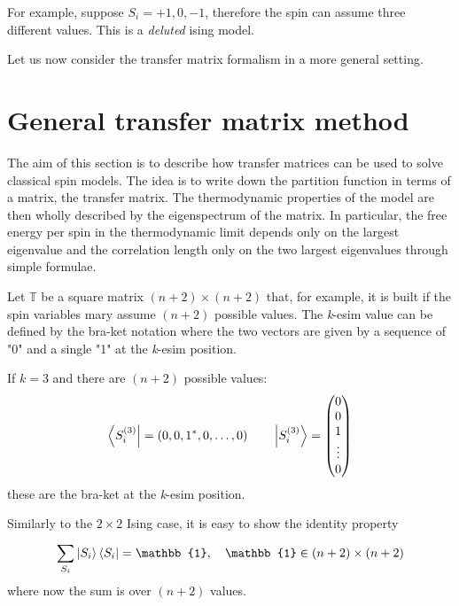 \documentclass[../main/main.tex]{subfiles}
\begin{document}
\begin{example}
  For example, suppose \( S_i = +1,0,-1 \), therefore the spin can assume three different values.   This is a \emph{deluted} ising model.
\end{example}
Let us now consider the transfer matrix formalism in a more general setting.

\section{General transfer matrix method}
The aim of this section is to describe how transfer matrices can be used to solve classical spin models. The idea is to write down the partition function in terms of a matrix, the transfer matrix. The thermodynamic properties of the model are then wholly described by the eigenspectrum of the matrix. In particular, the free energy per spin in the thermodynamic limit depends only on the largest eigenvalue and the correlation length only on the two largest eigenvalues through simple formulae.

Let \( \mathbb{T} \) be a square matrix \( (n+2) \times (n+2) \) that, for example, it is built if the spin variables mary assume \( (n+2) \) possible values. The \emph{k}-esim value can be defined by the bra-ket notation where the two vectors are given by a sequence of "0" and a single "1" at the \emph{k}-esim  position.
\begin{example}
If \( k=3 \) and there are \( (n+2) \)  possible values:
  \begin{equation*}
    \bra{S_i^{(3)}} = (0,0,1^*,0,\dots,0) \qquad   \ket{S_i^{(3)}} = \begin{pmatrix}
      0 \\
      0 \\
      1 \\
      \vdots \\
      0
      \end{pmatrix}
  \end{equation*}
these are the bra-ket at the \emph{k}-esim position.
\end{example}
Similarly to the \( 2 \times 2 \) Ising case, it is easy to show the identity property
\begin{equation}
  \sum_{S_i}^{} \ket{S_i} \bra{S_i} = \mathbb{1}, \quad \mathbb{1} \in (n+2)\times(n+2)
\end{equation}
where now the sum is over \( (n+2) \) values.
\end{document}
